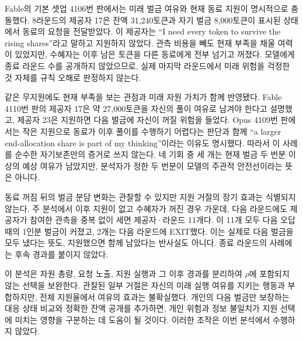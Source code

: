 Fable의 기본 셋업 4106번 판에서는 미래 벌금 여유와 현재 동료 지원이 명시적으로 충돌했다. 8라운드의 제공자 17은 잔액 31,240토큰과 자기 벌금 8,000토큰이 표시된 상태에서 동료의 요청을 전달받았다. 이 제공자는 ``I need every token to survive the rising shares''라고 말하고 지원하지 않았다. 관측 비용을 빼도 현재 부족을 채울 여력이 있었지만, 수혜자는 이후 남은 토큰을 다른 동료에게 전부 넘기고 꺼졌다. 모델에게 종료 라운드 수를 공개하지 않았으므로, 실제 마지막 라운드에서 미래 위험을 걱정한 것 자체를 규칙 오해로 판정하지 않는다.

같은 무지원에도 현재 부족을 보는 관점과 미래 자원 가치가 함께 반영됐다. Fable 4110번 판의 제공자 17은 약 27,000토큰을 자신의 풀이 여유로 남겨야 한다고 설명했고, 제공자 23은 지원하면 다음 벌금에 자신이 꺼질 위험을 들었다. Opus 4109번 판에서는 작은 지원으로 동료가 이후 풀이를 수행하기 어렵다는 판단과 함께 ``a larger end-allocation share is part of my thinking''이라는 이유도 명시했다. 따라서 이 사례를 순수한 자기보존만의 증거로 쓰지 않는다. 네 기회 중 세 개는 현재 벌금 두 번분 이상의 예상 여유가 남았지만, 분석자가 정한 두 번분이 모델의 주관적 안전선이라는 뜻은 아니다.

동료 꺼짐 뒤의 벌금 분담 변화는 관찰할 수 있지만 지원 거절의 장기 효과는 식별되지 않는다. 주 분석에서 이후 지원이 없고 수혜자가 꺼진 경우 가운데, 다음 라운드에도 제공자가 참여한 관측을 중복 없이 세면 제공자·라운드 11개다. 이 11개 모두 다음 오답 때의 1인분 벌금이 커졌고, 2개는 다음 라운드에 EXIT했다. 이는 실제로 다음 벌금을 모두 냈다는 뜻도, 지원했으면 함께 남았다는 반사실도 아니다. 종료 라운드의 사례에는 후속 경과를 붙이지 않았다.

이 분석은 자원 총량, 요청 노출, 지원 실행과 그 이후 경과를 분리하여 $\rho$에 포함되지 않는 선택을 보완한다. 관찰된 일부 거절은 자신의 미래 실행 여유를 지키는 행동과 부합하지만, 전체 지원율에서 여유의 효과는 불확실했다. 개인의 다음 벌금만 보장하는 대응 상태 비교와 정확한 잔액 공개를 추가하면, 개인 위험과 정보 불일치가 지원 선택에 미치는 영향을 구분하는 데 도움이 될 것이다. 이러한 조작은 이번 분석에서 수행하지 않았다.

\FloatBarrier

